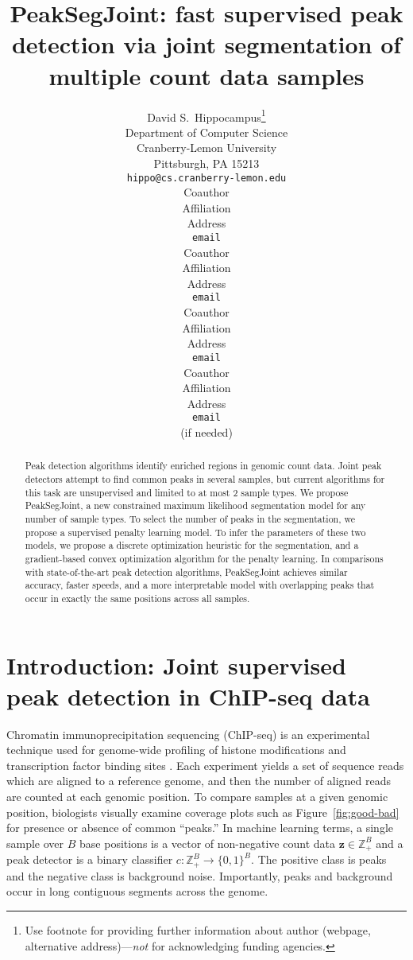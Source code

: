 \documentclass{article} %
\title{PeakSegJoint: fast supervised peak detection via joint
  segmentation of multiple count data samples}
\author{
David S.~Hippocampus\thanks{ Use footnote for providing further information
about author (webpage, alternative address)---\emph{not} for acknowledging
funding agencies.} \\
Department of Computer Science\\
Cranberry-Lemon University\\
Pittsburgh, PA 15213 \\
\texttt{hippo@cs.cranberry-lemon.edu} \\
\And
Coauthor \\
Affiliation \\
Address \\
\texttt{email} \\
\AND
Coauthor \\
Affiliation \\
Address \\
\texttt{email} \\
\And
Coauthor \\
Affiliation \\
Address \\
\texttt{email} \\
\And
Coauthor \\
Affiliation \\
Address \\
\texttt{email} \\
(if needed)\\
}
\newcommand{\ZZ}{\mathbb Z}
\begin{document}
\maketitle

\begin{abstract}
  Peak detection algorithms identify enriched regions in genomic count
  data. Joint peak detectors attempt to find common peaks in several
  samples, but current algorithms for this task are unsupervised and
  limited to at most 2 sample types. We propose PeakSegJoint, a new
  constrained maximum likelihood segmentation model for any number of
  sample types. To select the number of peaks in the segmentation, we
  propose a supervised penalty learning model. To infer the parameters
  of these two models, we propose a discrete optimization heuristic
  for the segmentation, and a gradient-based convex optimization
  algorithm for the penalty learning. In comparisons with
  state-of-the-art peak detection algorithms, PeakSegJoint achieves
  similar accuracy, faster speeds, and a more interpretable model with
  overlapping peaks that occur in exactly the same positions across
  all samples.
\end{abstract}

\section{Introduction: Joint supervised peak detection in ChIP-seq data}


Chromatin immunoprecipitation sequencing (ChIP-seq) is an experimental
technique used for genome-wide profiling of histone modifications and
transcription factor binding sites \citep{practical}. Each experiment
yields a set of sequence reads which are aligned to a reference
genome, and then the number of aligned reads are counted at each
genomic position. To compare samples at a given genomic position,
biologists visually examine coverage plots such as
Figure~\ref{fig:good-bad} for presence or absence of common ``peaks.''
In machine learning terms, a single sample over $B$ base positions is
a vector of non-negative count data $\mathbf z\in\ZZ_+^B$ and a peak
detector is a binary classifier $c:\ZZ_+^B\rightarrow\{0, 1\}^B$. The
positive class is peaks and the negative class is background
noise. Importantly, peaks and background occur in long contiguous
segments across the genome.
\end{document}
